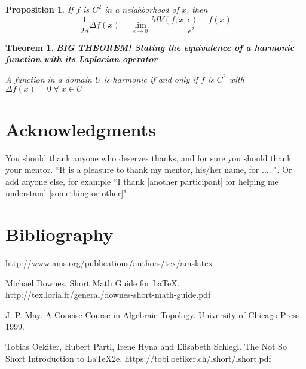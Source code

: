 \documentclass[openany, amssymb, psamsfonts]{amsart}
\newtheorem{thm}{Theorem}[section]
\newtheorem{prop}{Proposition}[section]
\theoremstyle{definition}
\numberwithin{equation}{section}
\let\oldforall\forall
\renewcommand{\forall}{\;\oldforall\; }
\renewcommand{\_}[1]{\underline{#1}}
\begin{document}
\begin{prop}
    If \(f\) is \(C^2\) in a neighborhood of \(x\), then \begin{equation}
        \dfrac{1}{2d}  \Delta f(x) = \lim_{\epsilon \to 0} \dfrac{MV(f; x, \epsilon) - f(x)}{\epsilon^2}
    \end{equation}
\end{prop}

\begin{thm}

    \textbf{BIG THEOREM! Stating the equivalence of a harmonic function with its Laplacian operator}
    
    A function in a domain \(U\) is harmonic if and only if \(f\) is \(C^2\) with \(\Delta f(x) = 0 \forall x \in U\)
\end{thm}
\newpage

\section*{Acknowledgments}  You should thank anyone who deserves thanks, and for sure you should
thank your mentor.   ``It is a pleasure to thank my mentor,
his/her name, for ....  ".   Or add anyone else, for example ``I thank [another participant] for helping
me understand [something or other]"

\section{Bibliography}
\begin{thebibliography}{9}

     http://www.ams.org/publications/authors/tex/amslatex

    Michael Downes.
    Short Math Guide for \LaTeX.
    http://tex.loria.fr/general/downes-short-math-guide.pdf

    J. P. May.
    A Concise Course in Algebraic Topology.
    University of Chicago Press. 1999.

    Tobias Oekiter, Hubert Partl, Irene Hyna and Elisabeth Schlegl.
    The Not So Short Introduction to \LaTeX 2e.
    https://tobi.oetiker.ch/lshort/lshort.pdf

\end{thebibliography}
\end{document}
